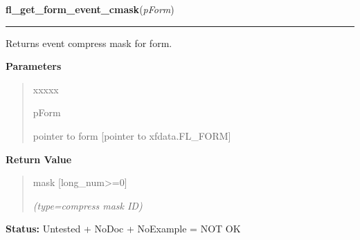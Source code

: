 \hspace{.8\funcindent}\begin{boxedminipage}{\funcwidth}

    \raggedright \textbf{fl\_get\_form\_event\_cmask}(\textit{pForm})

    \vspace{-1.5ex}

    \rule{\textwidth}{0.5\fboxrule}
\setlength{\parskip}{2ex}
    Returns event compress mask for form.

\setlength{\parskip}{1ex}
      \textbf{Parameters}
      \vspace{-1ex}

      \begin{quote}
        \begin{Ventry}{xxxxx}

          \item[pForm]

          pointer to form [pointer to xfdata.FL\_FORM]

        \end{Ventry}

      \end{quote}

      \textbf{Return Value}
    \vspace{-1ex}

      \begin{quote}
      mask [long\_num{\textgreater}=0]

      {\it (type=compress mask ID)}

      \end{quote}

\textbf{Status:} Untested + NoDoc + NoExample = NOT OK



    \end{boxedminipage}

    \label{xformslib:library:fl_set_form_geometry}

    \vspace{0.5ex}

